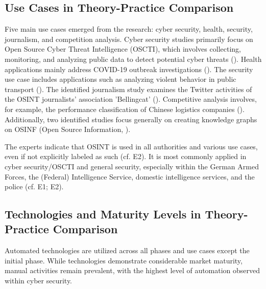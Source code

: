 \documentclass[10pt]{article}
\begin{document}
\subsection{Use Cases in Theory-Practice Comparison}

Five main use cases emerged from the research: cyber security, health, security, journalism,
and competition analysis. Cyber security studies primarily focus on Open Source Cyber Threat
Intelligence (OSCTI), which involves collecting, monitoring, and analyzing public
data to detect potential cyber threats (\cite{Ahuja.2022}).
Health applications mainly address COVID-19 outbreak investigations (\cite{Kpozehouen.2020}).
The security use case includes applications such as
analyzing violent behavior in public transport (\cite{Nobili.2021}). The identified journalism study examines the
Twitter activities of the OSINT journalists' association 'Bellingcat' (\cite{Bar.2023}). Competitive analysis
involves, for example, the performance classification of Chinese logistics companies (\cite{Tao.2023}).
Additionally, two identified studies focus generally on creating knowledge graphs on OSINF (Open Source Information, \cite{Hu.2023, Ma.2022}).

The experts indicate that OSINT is used in all authorities and various use cases, even if not explicitly labeled as such (cf. E2). It is most commonly applied in cyber security/OSCTI and general security, especially within the German Armed Forces, the (Federal) Intelligence Service, domestic intelligence services, and the police (cf. E1; E2).

\subsection{Technologies and Maturity Levels in Theory-Practice Comparison} \label{sec:matcomp}

Automated technologies are utilized across all phases and use cases except the initial phase.
While technologies demonstrate considerable market maturity, manual activities remain prevalent, with the highest level of automation observed within cyber security.
\end{document}
